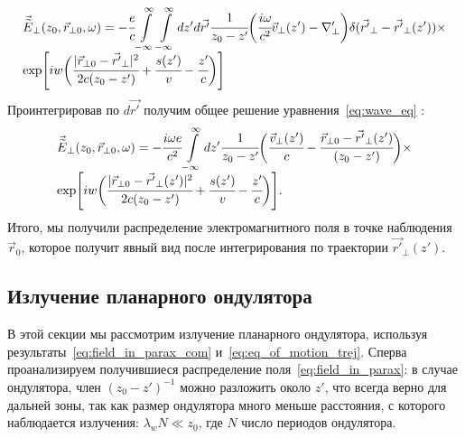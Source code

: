 \begin{equation}
	\begin{array}{lcl}
		\vec{\widetilde{E}}_{\bot}(z_0,  \vec{r}_{\bot 0}, \omega) = -\cfrac{e}{c}  \displaystyle\int\limits_{-\infty}^{\infty}\int\limits_{-\infty}^{\infty} dz'd\vec{r'}\cfrac{1}{z_0 - z'}
		\bigg(\cfrac{i\omega}{c^2}\vec{v}_{\bot}(z')
		-\nabla'_{\bot}\bigg) \delta(\vec{r'}_{\bot} - \vec{r'}_{\bot}(z'))\times\\
		\exp[iw\bigg( \cfrac{|\vec{r}_{\bot 0} - \vec{r'}_{\bot}|^2}{2c(z_0 - z')} +\cfrac{s(z')}{v} - \cfrac{z'}{c} \bigg)]
	\end{array}	
\end{equation}
Проинтегрировав по $d\vec{r'}$ получим общее решение уравнения~\ref{eq:wave_eq} :
\begin{equation}
	\label{eq:field_in_parax_com}
	\begin{array}{lcl}
		\vec{\widetilde{E}}_{\bot}(z_0,  \vec{r}_{\bot 0}, \omega) = -\cfrac{i\omega e}{c^2}  \displaystyle\int\limits_{-\infty}^{\infty} dz'
		\cfrac{1}{z_0 - z'}
		\bigg(\cfrac{\vec{v}_{\bot}(z')}{c}
		- \cfrac{\vec{r}_{\bot 0} - \vec{r'}_{\bot}(z')}{(z_0 - z')}\bigg)\times\\
		\exp[iw\bigg(\cfrac{|\vec{r}_{\bot 0} - \vec{r'}_{\bot}(z')|^2}{2c(z_0 - z')} + \cfrac{s(z')}{v} - \cfrac{z'}{c} \bigg)].
	\end{array}	
\end{equation}
Итого, мы получили распределение электромагнитного поля в точке наблюдения $\vec{r}_0$, которое получит явный вид после интегрирования по траектории $\vec{r'}_{\bot}(z')$.

\subsection{Излучение планарного ондулятора}
В этой секции мы рассмотрим излучение планарного ондулятора, используя результаты~\ref{eq:field_in_parax_com} и~\ref{eq:eq_of_motion_trej}. Сперва проанализируем получившиеся распределение поля~\ref{eq:field_in_parax}: в случае ондулятора, член $(z_0 - z')^{-1}$ можно разложить около $z'$, что всегда верно для дальней зоны, так как размер ондулятора много меньше расстояния, с которого наблюдается излучения: $\lambda_w N \ll z_0$, где $N$ число периодов ондулятора.

